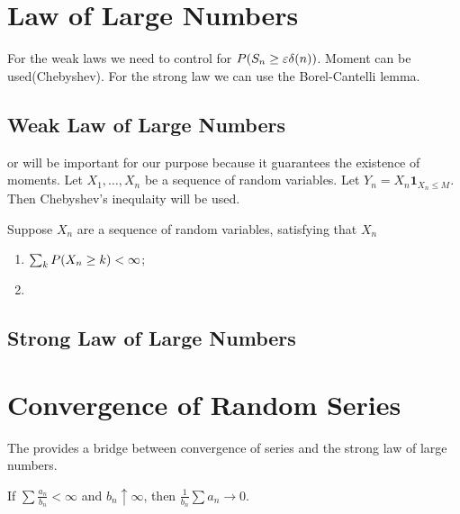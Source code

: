 \section{Law of Large Numbers}

For the weak laws we need to control for \(P\pqty{S_{n} \geq \epsilon \delta(n)}\). Moment can be used(Chebyshev). For the strong law we can use the Borel-Cantelli lemma. 

\subsection{Weak Law of Large Numbers}

 or  will be important for our purpose because it guarantees the existence of moments. Let \(X_{1},\dots, X_{n}\) be a sequence of random variables. Let \(Y_{n} = X_{n}\mathbf{1}_{X_{n} \leq M}\). Then Chebyshev's inequlaity will be used.

\begin{thm}
    Suppose \(X_{n}\) are a sequence of random variables, satisfying that \(X_{n}\)
    \begin{enumerate}
        \item \(\sum_{k} P \pqty{X_{n} \geq k} < \infty\);
        \item 
    \end{enumerate}
\end{thm}

\subsection{Strong Law of Large Numbers}

\section{Convergence of Random Series}

The  provides a bridge between convergence of series and the strong law of large numbers. 
\begin{lemma}
    If \(\sum \frac{a_{n}}{b_{n}} < \infty\) and \(b_{n} \uparrow \infty\), then \(\frac{1}{b_{n}} \sum a_{n} \to 0\). 
\end{lemma}

\begin{thm}
    
\end{thm}




